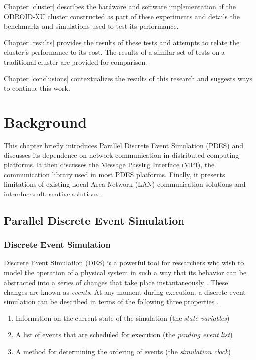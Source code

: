 \documentclass[11pt]{book}
\begin{document}
Chapter \ref{cluster} describes the hardware and software implementation of the
ODROID-XU cluster constructed as part of these experiments and details the
benchmarks and simulations used to test its performance.

Chapter \ref{results} provides the results of these tests and attempts to relate
the cluster's performance to its cost. The results of a similar set of tests on
a traditional cluster are provided for comparison.

Chapter \ref{conclusions} contextualizes the results of this research and
suggests ways to continue this work.

\newpage
\chapter{Background}
\label{background}

This chapter briefly introduces Parallel Discrete Event Simulation (PDES) and
discusses its dependence on network communication in distributed computing
platforms. It then discusses the Message Passing Interface (MPI), the
communication library used in most PDES platforms. Finally, it presents
limitations of existing Local Area Network (LAN) communication solutions and
introduces alternative solutions.

\section{\textbf{Parallel Discrete Event Simulation}}

\subsection{\textbf{Discrete Event Simulation}}

Discrete Event Simulation (DES) is a powerful tool for researchers who wish to
model the operation of a physical system in such a way that its behavior can be
abstracted into a series of changes that take place instantaneously
\cite{jacob-13}. These changes are known as \textit{events}. At any moment
during execution, a discrete event simulation can be described in terms of the
following three properties \cite{fujimoto-pdes} \cite{jacob-13} \cite{page-94}.

\begin{enumerate}
  \item Information on the current state of the simulation (the \textit{state variables})
  \item A list of events that are scheduled for execution (the \textit{pending
    event list})
  \item A method for determining the ordering of events (the \textit{simulation
    clock})
\end{enumerate}
\end{document}
